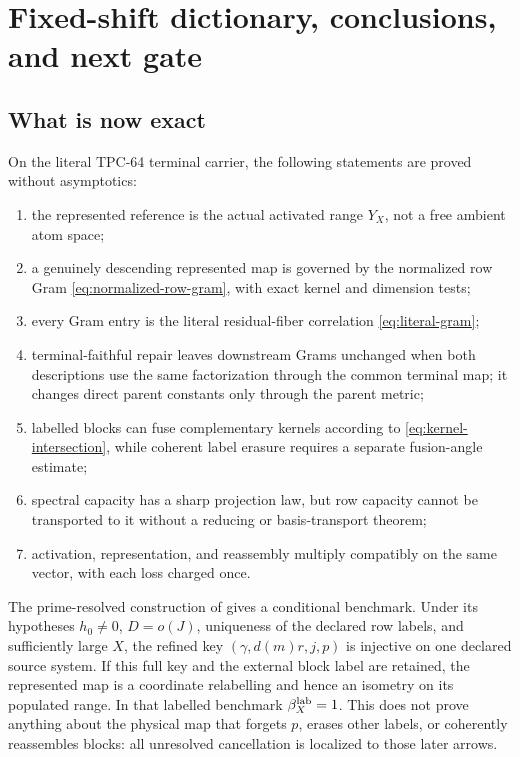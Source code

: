 \section{Fixed-shift dictionary, conclusions, and next gate}

\subsection{What is now exact}
On the literal TPC-64 terminal carrier, the following statements are proved
without asymptotics:
\begin{enumerate}[label=(\arabic*)]
\item the represented reference is the actual activated range \(Y_X\), not a
free ambient atom space;
\item a genuinely descending represented map is governed by the normalized
row Gram \eqref{eq:normalized-row-gram}, with exact kernel and dimension tests;
\item every Gram entry is the literal residual-fiber correlation
\eqref{eq:literal-gram};
\item terminal-faithful repair leaves downstream Grams unchanged when both
descriptions use the same factorization through the common terminal map; it
changes direct parent constants only through the parent metric;
\item labelled blocks can fuse complementary kernels according to
\eqref{eq:kernel-intersection}, while coherent label erasure requires a
separate fusion-angle estimate;
\item spectral capacity has a sharp projection law, but row capacity cannot be
transported to it without a reducing or basis-transport theorem;
\item activation, representation, and reassembly multiply compatibly on the
same vector, with each loss charged once.
\end{enumerate}

The prime-resolved construction of \citet{WangTPC55} gives a conditional
benchmark. Under its hypotheses \(h_0\ne0\), \(D=o(J)\), uniqueness of the
declared row labels, and sufficiently large \(X\), the refined key
\((\gamma,d(m)r,j,p)\) is injective on one declared source system. If this full
key and the external block label are retained, the represented map is a
coordinate relabelling and hence an isometry on its populated range. In that
labelled benchmark \(\beta_X^{\rm lab}=1\). This does not prove anything about
the physical map that forgets \(p\), erases other labels, or coherently
reassembles blocks: all unresolved cancellation is localized to those later
arrows.

